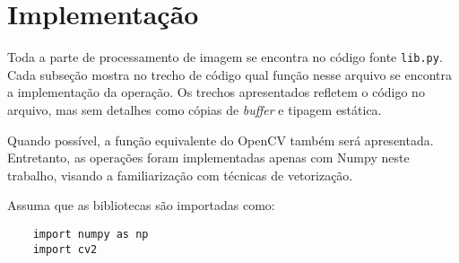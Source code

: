 \section{Implementação}

Toda a parte de processamento de imagem se encontra no código fonte \texttt{lib.py}. Cada subseção mostra no trecho de código qual função nesse arquivo se encontra a implementação da operação. Os trechos apresentados refletem o código no arquivo, mas sem detalhes como cópias de \textit{buffer} e tipagem estática.

Quando possível, a função equivalente do OpenCV também será apresentada. Entretanto, as operações foram implementadas apenas com Numpy neste trabalho, visando a familiarização com técnicas de vetorização.

Assuma que as bibliotecas são importadas como:
\begin{verbatim}
    import numpy as np
    import cv2
\end{verbatim}



